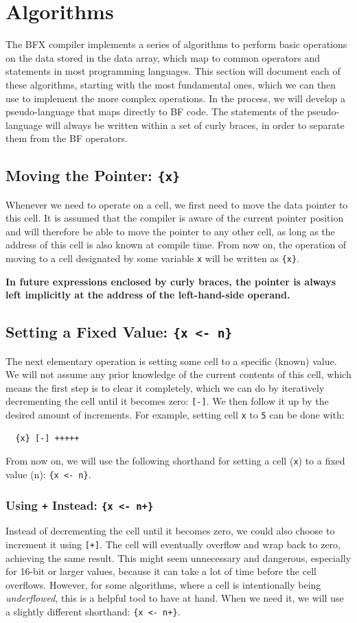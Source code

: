 \section{Algorithms}\label{section:algorithms}
The BFX compiler implements a series of algorithms to perform basic operations on the data stored in the data array, which map to common operators and statements in most programming languages. This section will document each of these algorithms, starting with the most fundamental ones, which we can then use to implement the more complex operations. In the process, we will develop a pseudo-language that maps directly to BF code. The statements of the pseudo-language will always be written within a set of curly braces, in order to separate them from the BF operators.

\subsection{Moving the Pointer: \texttt{\{x\}}}
Whenever we need to operate on a cell, we first need to move the data pointer to this cell. It is assumed that the compiler is aware of the current pointer position and will therefore be able to move the pointer to any other cell, as long as the address of this cell is also known at compile time. From now on, the operation of moving to a cell designated by some variable \texttt{x} will be written as \texttt{\{x\}}.

\textbf{In future expressions enclosed by curly braces, the pointer is always left implicitly at the address of the left-hand-side operand.}

\subsection{Setting a Fixed Value: \texttt{\{x <- n\}}}
The next elementary operation is setting some cell to a specific (known) value. We will not assume any prior knowledge of the current contents of this cell, which means the first step is to clear it completely, which we can do by iteratively decrementing the cell until it becomes zero: \texttt{[-]}. We then follow it up by the desired amount of increments. For example, setting cell \texttt{x} to \texttt{5} can be done with:
\begin{lstlisting}
  {x} [-] +++++
\end{lstlisting}
From now on, we will use the following shorthand for setting a cell (\texttt{x}) to a fixed value (n): \texttt{\{x <- n\}}.
\subsubsection{Using \texttt{+} Instead: \texttt{\{x <- n+\}}}
Instead of decrementing the cell until it becomes zero, we could also choose to increment it using \texttt{[+]}. The cell will eventually overflow and wrap back to zero, achieving the same result. This might seem unnecessary and dangerous, especially for 16-bit or larger values, because it can take a lot of time before the cell overflows. However, for some algorithms, where a cell is intentionally being \emph{underflowed}, this is a helpful tool to have at hand. When we need it, we will use a slightly different shorthand: \texttt{\{x <- n+\}}.

